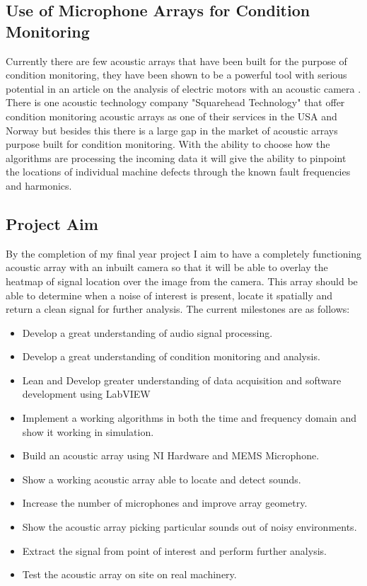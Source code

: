 \documentclass{UoNMCHA}
\numberwithin{equation}{section}
\begin{document}
\subsection{Use of Microphone Arrays for Condition Monitoring} \label{sec:use for CM}
    Currently there are few acoustic arrays that have been built for the purpose of condition monitoring, they have been shown to be a powerful tool with serious potential in an article on the analysis of electric motors with an acoustic camera \citep{Orm13}. There is one acoustic technology company "Squarehead Technology" that offer condition monitoring acoustic arrays as one of their services in the USA and Norway but besides this there is a large gap in the market of acoustic arrays purpose built for condition monitoring. With the ability to choose how the algorithms are processing the incoming data it will give the ability to pinpoint the locations of individual machine defects through the known fault frequencies and harmonics.
\subsection{Project Aim} \label{sec:Project  Aim}
    By the completion of my final year project I aim to have a completely functioning acoustic array with an inbuilt camera so that it will be able to overlay the heatmap of signal location over the image from the camera. This array should be able to determine when a noise of interest is present, locate it spatially and return a clean signal for further analysis. The current milestones are as follows:
    
    \begin{itemize}
        \item Develop a great understanding of audio signal processing.
        \item Develop a great understanding of condition monitoring and analysis.
        \item Lean and Develop greater understanding of data acquisition and software development using LabVIEW
        \item Implement a working algorithms in both the time and frequency domain and show it working in simulation.
        \item Build an acoustic array using NI Hardware and MEMS Microphone.
        \item Show a working acoustic array able to locate and detect sounds.
        \item Increase the number of microphones and improve array geometry.
        \item Show the acoustic array picking particular sounds out of noisy environments.
        \item Extract the signal from point of interest and perform further analysis.
        \item Test the acoustic array on site on real machinery.
    \end{itemize}
    
\end{document}

